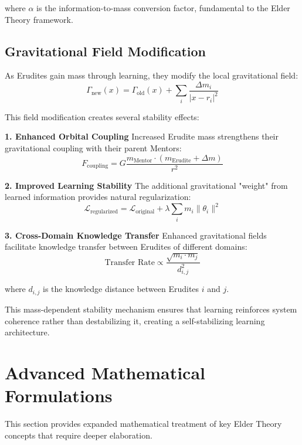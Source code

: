 where $\alpha$ is the information-to-mass conversion factor, fundamental to the Elder Theory framework.

\subsection{Gravitational Field Modification}

As Erudites gain mass through learning, they modify the local gravitational field:
\begin{equation}
\Gamma_{\text{new}}(x) = \Gamma_{\text{old}}(x) + \sum_{i} \frac{\Delta m_i}{|x - r_i|^2}
\end{equation}

This field modification creates several stability effects:

\textbf{1. Enhanced Orbital Coupling}
Increased Erudite mass strengthens their gravitational coupling with their parent Mentors:
\begin{equation}
F_{\text{coupling}} = G \frac{m_{\text{Mentor}} \cdot (m_{\text{Erudite}} + \Delta m)}{r^2}
\end{equation}

\textbf{2. Improved Learning Stability}
The additional gravitational "weight" from learned information provides natural regularization:
\begin{equation}
\mathcal{L}_{\text{regularized}} = \mathcal{L}_{\text{original}} + \lambda \sum_i m_i \|\theta_i\|^2
\end{equation}

\textbf{3. Cross-Domain Knowledge Transfer}
Enhanced gravitational fields facilitate knowledge transfer between Erudites of different domains:
\begin{equation}
\text{Transfer Rate} \propto \frac{\sqrt{m_i \cdot m_j}}{d_{i,j}^2}
\end{equation}

where $d_{i,j}$ is the knowledge distance between Erudites $i$ and $j$.

This mass-dependent stability mechanism ensures that learning reinforces system coherence rather than destabilizing it, creating a self-stabilizing learning architecture.

\section{Advanced Mathematical Formulations}

This section provides expanded mathematical treatment of key Elder Theory concepts that require deeper elaboration.

